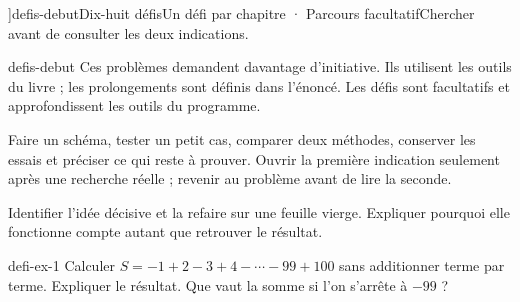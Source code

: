 \editionPage[\pdfbookmark[0]{Défis d’approfondissement}{bm-defis-debut-parent}]{defis-debut}{Dix-huit défis}{Un défi par chapitre · Parcours facultatif}{Chercher avant de consulter les deux indications.}
\begin{blocEdition}{defis-debut}
Ces problèmes demandent davantage d’initiative. Ils utilisent les outils du livre ; les prolongements sont définis dans l’énoncé. Les défis sont facultatifs et approfondissent les outils du programme.\par\bigskip
\begin{savoirfaire}Faire un schéma, tester un petit cas, comparer deux méthodes, conserver les essais et préciser ce qui reste à prouver. Ouvrir la première indication seulement après une recherche réelle ; revenir au problème avant de lire la seconde.\end{savoirfaire}
\begin{savoirfaire}Identifier l’idée décisive et la refaire sur une feuille vierge. Expliquer pourquoi elle fonctionne compte autant que retrouver le résultat.\end{savoirfaire}
\end{blocEdition}
\begin{blocEdition}{defi-ex-1}
Calculer $S=-1+2-3+4-\cdots-99+100$ sans additionner terme par terme. Expliquer le résultat. Que vaut la somme si l’on s’arrête à $-99$ ?\par{}\par\par{}\par{}\par{}\par{}\par{}\par{}
\end{blocEdition}
